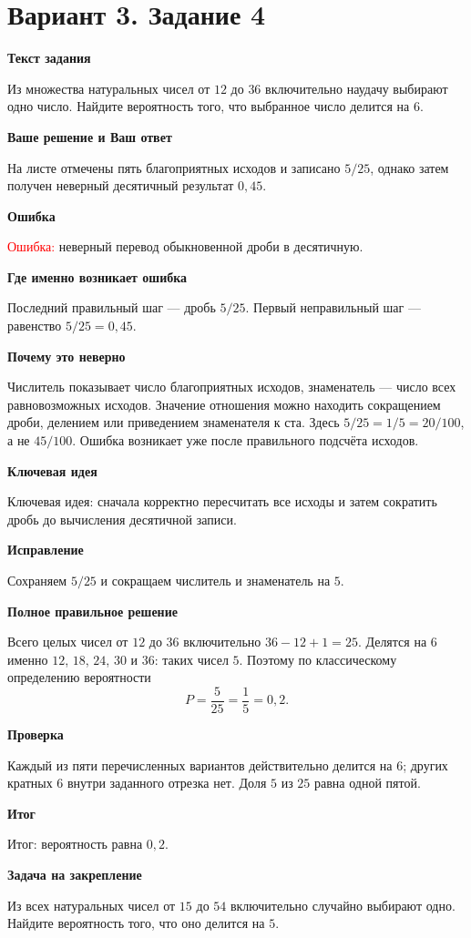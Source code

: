 \documentclass[11pt,a4paper]{article}
\newcommand{\Part}[1]{\par\medskip\noindent\textbf{#1}\par\smallskip}
\newcommand{\Task}[2]{\clearpage\phantomsection\label{task:#1}\section*{#2}}
\newcommand{\Err}[1]{\textcolor{red}{Ошибка:} #1}
\newcommand{\Idea}[1]{\textcolor{blue!60!black}{Ключевая идея:} #1}
\newcommand{\Result}[1]{\textcolor{teal!60!black}{Итог:} #1}
\begin{document}
\Task{v34}{Вариант 3. Задание 4}
\Part{Текст задания}
Из множества натуральных чисел от $12$ до $36$ включительно наудачу выбирают одно число. Найдите вероятность того, что выбранное число делится на $6$.
\Part{Ваше решение и Ваш ответ}
На листе отмечены пять благоприятных исходов и записано $5/25$, однако затем получен неверный десятичный результат $0{,}45$.
\Part{Ошибка}
\Err{неверный перевод обыкновенной дроби в десятичную.}
\Part{Где именно возникает ошибка}
Последний правильный шаг --- дробь $5/25$. Первый неправильный шаг --- равенство $5/25=0{,}45$.
\Part{Почему это неверно}
Числитель показывает число благоприятных исходов, знаменатель --- число всех равновозможных исходов. Значение отношения можно находить сокращением дроби, делением или приведением знаменателя к ста. Здесь $5/25=1/5=20/100$, а не $45/100$. Ошибка возникает уже после правильного подсчёта исходов.
\Part{Ключевая идея}
\Idea{сначала корректно пересчитать все исходы и затем сократить дробь до вычисления десятичной записи.}
\Part{Исправление}
Сохраняем $5/25$ и сокращаем числитель и знаменатель на $5$.
\Part{Полное правильное решение}
Всего целых чисел от $12$ до $36$ включительно $36-12+1=25$. Делятся на $6$ именно $12$, $18$, $24$, $30$ и $36$: таких чисел $5$. Поэтому по классическому определению вероятности
\[P=\frac{5}{25}=\frac15=0{,}2.\]
\Part{Проверка}
Каждый из пяти перечисленных вариантов действительно делится на $6$; других кратных $6$ внутри заданного отрезка нет. Доля $5$ из $25$ равна одной пятой.
\Part{Итог}
\Result{вероятность равна $0{,}2$.}
\Part{Задача на закрепление}
Из всех натуральных чисел от $15$ до $54$ включительно случайно выбирают одно. Найдите вероятность того, что оно делится на $5$.
\end{document}
